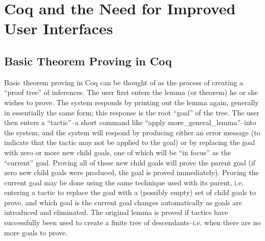 \documentclass[11pt]{amsart}
\begin{document}
\section{Coq and the Need for Improved User Interfaces}

\subsection{Basic Theorem Proving in Coq}

Basic theorem proving in Coq can be thought of as the process of creating a ``proof tree'' of inferences.  The user first enters the lemma (or theorem) he or she wishes to prove.  The system responds by printing out the lemma again, generally in essentially the same form; this response is the root ``goal'' of the tree.  The user then enters a ``tactic''--a short command like ``apply more\_general\_lemma''--into the system, and the system will respond by producing either an error message (to indicate that the tactic may not be applied to the goal) or by replacing the goal with zero or more new child goals, one of which will be ``in focus'' as the ``current'' goal.  Proving all of these new child goals will prove the parent goal (if zero new child goals were produced, the goal is proved immediately).  Proving the current goal may be done using the same technique used with its parent, i.e. entering a tactic to replace the goal with a (possibly empty) set of child goals to prove, and which goal is the current goal changes automatically as goals are introduced and eliminated.  The original lemma is proved if tactics have successfully been used to create a finite tree of descendants--i.e. when there are no more goals to prove.
\end{document}
